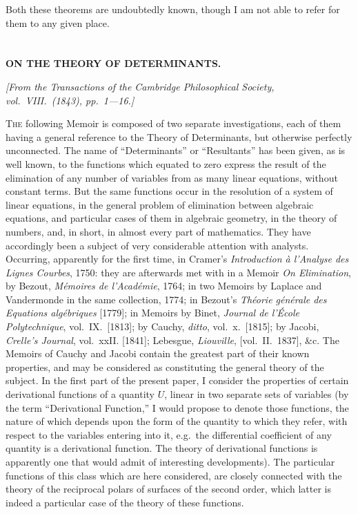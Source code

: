 \documentclass[11pt,a4paper]{article}
\theoremstyle{plain}
\theoremstyle{definition}
\theoremstyle{remark}
\begin{document}
Both these theorems are undoubtedly known, though I am not able to refer for
them to any given place.

\newpage
\setcounter{section}{11}


\section{}
\begin{center}
\textbf{ON THE THEORY OF DETERMINANTS.}
\end{center}
\textit{[From the Transactions of the Cambridge Philosophical Society, vol.\ VIII.\ (1843), pp.\ 1---16.]}

\textsc{The} following Memoir is composed of two separate investigations, each of them
having a general reference to the Theory of Determinants, but otherwise perfectly
unconnected. The name of ``Determinants'' or ``Resultants'' has been given, as is well
known, to the functions which equated to zero express the result of the elimination
of any number of variables from as many linear equations, without constant terms.
But the same functions occur in the resolution of a system of linear equations, in the
general problem of elimination between algebraic equations, and particular cases of them
in algebraic geometry, in the theory of numbers, and, in short, in almost every part
of mathematics. They have accordingly been a subject of very considerable attention
with analysts. Occurring, apparently for the first time, in Cramer's \textit{Introduction \`{a}
l'Analyse des Lignes Courbes}, 1750: they are afterwards met with in a Memoir \textit{On
Elimination}, by Bezout, \textit{M\'{e}moires de l'Acad\'{e}mie}, 1764; in two Memoirs by Laplace
and Vandermonde in the same collection, 1774; in Bezout's \textit{Th\'{e}orie g\'{e}n\'{e}rale des
Equations alg\'{e}briques} [1779]; in Memoirs by Binet, \textit{Journal de l'\'{E}cole Polytechnique},
vol.~IX.\ [1813]; by Cauchy, \textit{ditto}, vol.~x.\ [1815]; by Jacobi, \textit{Crelle's Journal}, vol.~xxII.
[1841]; Lebesgue, \textit{Liouville}, [vol.~II.\ 1837], \&c. The Memoirs of Cauchy and Jacobi
contain the greatest part of their known properties, and may be considered as constituting
the general theory of the subject. In the first part of the present paper, I consider
the properties of certain derivational functions of a quantity $U$, linear in two separate
sets of variables (by the term ``Derivational Function,'' I would propose to denote
those functions, the nature of which depends upon the form of the quantity to which
they refer, with respect to the variables entering into it, e.g.\ the differential coefficient
of any quantity is a derivational function. The theory of derivational functions is
apparently one that would admit of interesting developments). The particular functions
of this class which are here considered, are closely connected with the theory of the
reciprocal polars of surfaces of the second order, which latter is indeed a particular case
of the theory of these functions.
\end{document}
